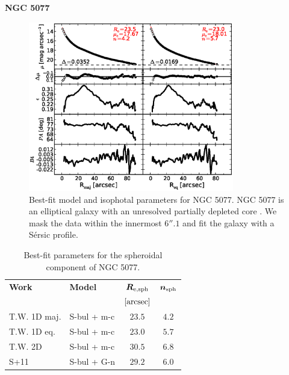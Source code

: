 \documentclass[preprint2]{emulateapj}
\newcommand{\fitfigurewidth}{0.8\textwidth}
\begin{document}
  \clearpage\newpage\noindent
  {\bf NGC 5077 \\}

  \begin{figure}[h]
  \begin{center}
  \includegraphics[width=\fitfigurewidth]{images/n5077_1Dfit.eps}
  \caption{Best-fit model and isophotal parameters for NGC 5077. 
  NGC 5077 is an elliptical galaxy with an unresolved partially depleted core \citep{trujillo2004coresersicmodel}. 
  We mask the data within the innermost $6''.1$ and fit the galaxy with a S\'ersic profile. }
  \end{center}
  \end{figure}

  \begin{table}[h]
  \small
  \caption{Best-fit parameters for the spheroidal component of NGC 5077.}
  \begin{center}
  \begin{tabular}{llcc}
  \hline
  {\bf Work} & {\bf Model}   & $\bm R_{\rm e,sph}$    & $\bm n_{\rm sph}$ \\
    &  &  $[\rm arcsec]$ & \\
  \hline
  T.W. 1D maj. & S-bul + m-c & $23.5$  &  $4.2$ \\
  T.W. 1D eq.  & S-bul + m-c & $23.0$  &  $5.7$ \\
  T.W. 2D      & S-bul + m-c & $30.5$  &  $6.8$ \\
  \hline
  S+11         & S-bul + G-n & $29.2$  &  $6.0$ \\
  \hline
  \end{tabular}
  \end{center}
  \label{tab:n5077}
  \end{table}
\end{document}
